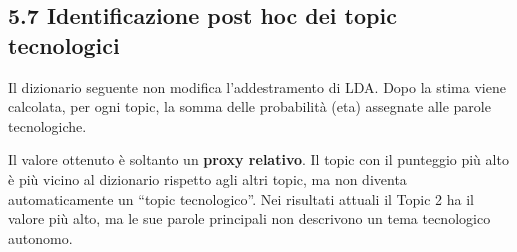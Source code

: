 \documentclass[
]{article}
\begin{document}
\subsection{5.7 Identificazione post hoc dei topic
tecnologici}\label{identificazione-post-hoc-dei-topic-tecnologici}

Il dizionario seguente non modifica l'addestramento di LDA. Dopo la
stima viene calcolata, per ogni topic, la somma delle probabilità (eta)
assegnate alle parole tecnologiche.

Il valore ottenuto è soltanto un \textbf{proxy relativo}. Il topic con
il punteggio più alto è più vicino al dizionario rispetto agli altri
topic, ma non diventa automaticamente un ``topic tecnologico''. Nei
risultati attuali il Topic 2 ha il valore più alto, ma le sue parole
principali non descrivono un tema tecnologico autonomo.
\end{document}
